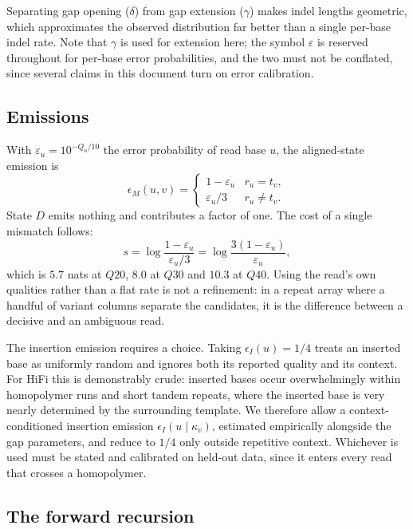 \documentclass[11pt]{article}
\begin{document}
Separating gap opening ($\delta$) from gap extension ($\gamma$) makes indel
lengths geometric, which approximates the observed distribution far better than
a single per-base indel rate.  Note that $\gamma$ is used for extension here;
the symbol $\varepsilon$ is reserved throughout for per-base error
probabilities, and the two must not be conflated, since several claims in this
document turn on error calibration.

\subsection{Emissions}

With $\varepsilon_u = 10^{-Q_u/10}$ the error probability of read base $u$, the
aligned-state emission is
\begin{equation}
    \epsilon_M(u,v) =
    \begin{cases}
        1-\varepsilon_u & r_u = t_v,\\[2pt]
        \varepsilon_u/3 & r_u \neq t_v .
    \end{cases}
\end{equation}
State $D$ emits nothing and contributes a factor of one.  The cost of a single
mismatch follows:
\begin{equation}
    s = \log\frac{1-\varepsilon_u}{\varepsilon_u/3}
      = \log\frac{3(1-\varepsilon_u)}{\varepsilon_u} ,
\label{eq:mismatch-cost}
\end{equation}
which is $5.7$ nats at $Q20$, $8.0$ at $Q30$ and $10.3$ at $Q40$.  Using the
read's own qualities rather than a flat rate is not a refinement: in a repeat
array where a handful of variant columns separate the candidates, it is the
difference between a decisive and an ambiguous read.

The insertion emission requires a choice.  Taking $\epsilon_I(u) = 1/4$ treats
an inserted base as uniformly random and ignores both its reported quality and
its context.  For HiFi this is demonstrably crude: inserted bases occur
overwhelmingly within homopolymer runs and short tandem repeats, where the
inserted base is very nearly determined by the surrounding template.  We
therefore allow a context-conditioned insertion emission
$\epsilon_I(u \mid \kappa_v)$, estimated empirically alongside the gap
parameters, and reduce to $1/4$ only outside repetitive context.  Whichever is
used must be stated and calibrated on held-out data, since it enters every
read that crosses a homopolymer.

\subsection{The forward recursion}
\end{document}
